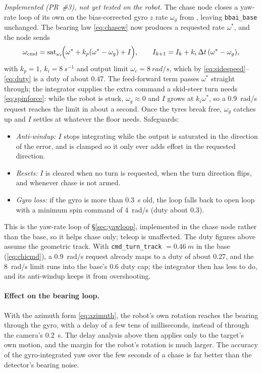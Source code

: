 \emph{Implemented (PR~\#3), not yet tested on the robot.} The chase node
closes a yaw-rate loop of its own on the bias-corrected gyro $z$ rate
$\omega_g$ from , leaving \texttt{bbai\_base}
unchanged. The bearing law \eqref{eq:chasew} now produces a requested rate
$\omega^\ast$, and the node sends
\begin{equation}\label{eq:chaseyaw}
\omega_{\mathrm{cmd}}=\operatorname{sat}_{\omega_{c}}\!\Bigl(\omega^\ast+k_p(\omega^\ast-\omega_g)+I\Bigr),
\qquad
I_{k+1}=I_k+k_i\,\Delta t\,(\omega^\ast-\omega_g),
\end{equation}
with $k_p=1$, $k_i=\SI{8}{s^{-1}}$ and output limit
$\omega_c=\SI{8}{rad/s}$, which by \eqref{eq:sidespeed}--\eqref{eq:duty} is a
duty of about 0.47. The feed-forward term passes $\omega^\ast$ straight
through; the integrator supplies the extra command a skid-steer turn needs
\eqref{eq:spinforce}: while the robot is stuck, $\omega_g\approx0$ and $I$
grows at $k_i\omega^\ast$, so a \SI{0.9}{rad/s} request reaches the limit in
about a second. Once the tyres break free, $\omega_g$ catches up and $I$
settles at whatever the floor needs. Safeguards:
\begin{itemize}
\item \emph{Anti-windup:} $I$ stops integrating while the output is
  saturated in the direction of the error, and is clamped so it only ever adds
  effort in the requested direction.
\item \emph{Resets:} $I$ is cleared when no turn is requested, when the turn
  direction flips, and whenever chase is not armed.
\item \emph{Gyro loss:} if the gyro is more than \SI{0.3}{s} old, the loop
  falls back to open loop with a minimum spin command of \SI{4}{rad/s}
  (duty about 0.3).
\end{itemize}
This is the yaw-rate loop of \S\ref{sec:yawloop}, implemented in the chase
node rather than the base, so it helps chase only; teleop is unaffected.
The duty figures above assume the geometric track. With
\texttt{cmd\_turn\_track} $=\SI{0.46}{m}$ in the base (\eqref{eq:chicmd}),
a \SI{0.9}{rad/s} request already maps to a duty of about 0.27, and the
\SI{8}{rad/s} limit runs into the base's 0.6 duty cap; the integrator then
has less to do, and its anti-windup keeps it from overshooting.

\paragraph{Effect on the bearing loop.} With the azimuth form
\eqref{eq:azimuth}, the robot's own rotation reaches the bearing through
the gyro, with a delay of a few tens of milliseconds, instead of through the
camera's \SI{0.2}{s}. The delay analysis above then applies only to the
target's own motion, and the margin for the robot's rotation is much larger.
The accuracy of the gyro-integrated yaw over the few seconds of a chase is
far better than the detector's bearing noise.

